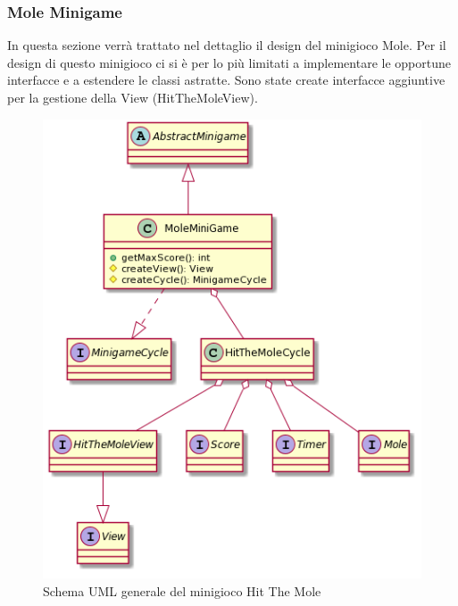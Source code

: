 \documentclass[a4paper,12pt]{report}
\begin{document}
	\subsubsection{Mole Minigame}
	In questa sezione verrà trattato nel dettaglio il design del minigioco Mole.\newline
	\newline
	Per il design di questo minigioco ci si è per lo più limitati a implementare le opportune interfacce e a estendere le classi astratte.
    Sono state create interfacce aggiuntive per la gestione della View (HitTheMoleView).
    \begin{figure}[!t]
        \centering{}
        \includegraphics[width=150mm]{images/squarcialupi/molegame-overview.png}
        \caption{Schema UML generale del minigioco Hit The Mole}
        \label{img:molegame-overview}
    \end{figure}
\end{document}
